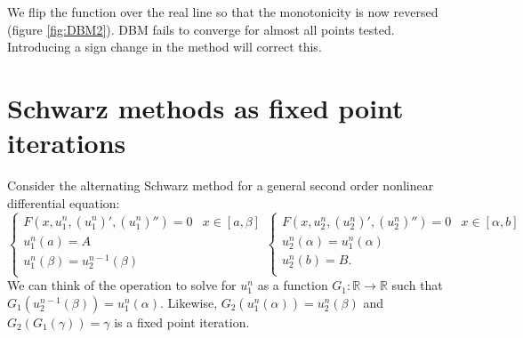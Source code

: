 \documentclass{book}
\begin{document}
We flip the function over the real line so that the monotonicity is now reversed (figure \ref{fig:DBM2}).
DBM fails to converge for almost all points tested.
Introducing a sign change in the method will correct this.

\chapter{Schwarz methods as fixed point iterations}

Consider the alternating Schwarz method for a general second order nonlinear differential equation:
\begin{equation} \label{eq:AS}
\begin{cases} F(x,u_1^n,(u_1^n)',(u_1^n)'') = 0 & x \in [a,\beta] \\
u^n_1(a) = A \\
u^n_1(\beta) = u_2^{n-1}(\beta) \\
\end{cases}
\begin{cases} F(x,u^n_2,(u^n_2)',(u^n_2)'') = 0 & x \in [\alpha,b] \\
u^n_2(\alpha) = u^n_1(\alpha) \\
u^n_2(b) = B . \\
\end{cases}
\end{equation}
We can think of the operation to solve for $u_1^n$ as a function $G_1: \mathbb{R} \rightarrow \mathbb{R}$ such that $G_1(u_2^{n-1}(\beta)) = u_1^n(\alpha)$.
Likewise, $G_2(u_1^n(\alpha)) = u_2^n(\beta)$ and $G_2(G_1(\gamma)) = \gamma$ is a fixed point iteration.
\end{document}
